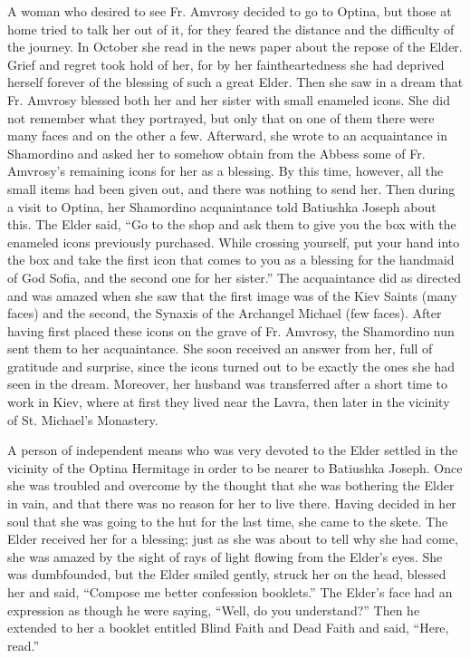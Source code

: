 A woman who desired to see Fr. Amvrosy decided to go to Optina, but those at home tried to talk her out of it, for they feared the distance and the difficulty of the journey. In October she read in the news paper about the repose of the Elder. Grief and regret took hold of her, for by her faintheartedness she had deprived herself forever of the blessing of such a great Elder. Then she saw in a dream that Fr. Amvrosy blessed both her and her sister with small enameled icons. She did not remember what they portrayed, but only that on one of them there were many faces and on the other a few. Afterward, she wrote to an acquaintance in Shamordino and asked her to somehow obtain from the Abbess some of Fr. Amvrosy's remaining icons for her as a blessing. By this time, however, all the small items had been given out, and there was nothing to send her. Then during a visit to Optina, her Shamordino acquaintance told Batiushka Joseph about this. The Elder said, ``Go to the shop and ask them to give you the box with the enameled icons previously purchased. While crossing yourself, put your hand into the box and take the first icon that comes to you as a blessing for the handmaid of God Sofia, and the second one for her sister.'' The acquaintance did as directed and was amazed when she saw that the first image was of the Kiev Saints (many faces) and the second, the Synaxis of the Archangel Michael (few faces). After having first placed these icons on the grave of Fr. Amvrosy, the Shamordino nun sent them to her acquaintance. She soon received an answer from her, full of gratitude and surprise, since the icons turned out to be exactly the ones she had seen in the dream. Moreover, her husband was transferred after a short time to work in Kiev, where at first they lived near the Lavra, then later in the vicinity of St. Michael's Monastery.

A person of independent means who was very devoted to the Elder settled in the vicinity of the Optina Hermitage in order to be nearer to Batiushka Joseph. Once she was troubled and overcome by the thought that she was bothering the Elder in vain, and that there was no reason for her to live there. Having decided in her soul that she was going to the hut for the last time, she came to the skete. The Elder received her for a blessing; just as she was about to tell why she had come, she was amazed by the sight of rays of light flowing from the Elder's eyes. She was dumbfounded, but the Elder smiled gently, struck her on the head, blessed her and said, ``Compose me better confession booklets.'' The Elder's face had an expression as though he were saying, ``Well, do you understand?'' Then he extended to her a booklet entitled Blind Faith and Dead Faith and said, ``Here, read.''

